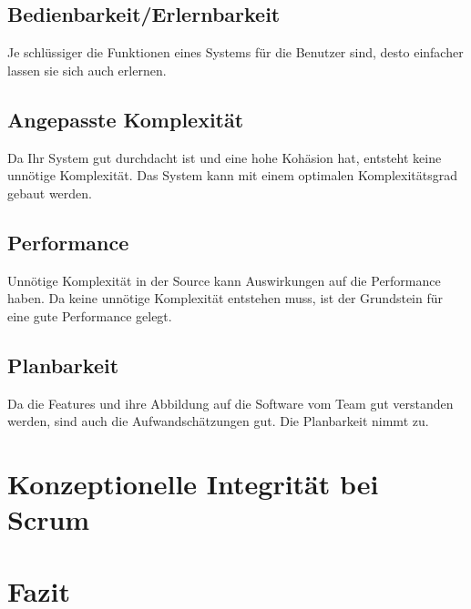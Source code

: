 \documentclass[a4paper, ngerman, 12pt, usenames, dvipsnames]{article}
\begin{document}
\subsection{Bedienbarkeit/Erlernbarkeit}
Je schlüssiger die Funktionen eines Systems für die Benutzer sind, desto einfacher lassen sie sich auch erlernen.
\subsection{Angepasste Komplexität}
Da Ihr System gut durchdacht ist und eine hohe Kohäsion hat, entsteht keine unnötige Komplexität. Das System kann mit einem optimalen Komplexitätsgrad gebaut werden.
\subsection{Performance}
Unnötige Komplexität in der Source kann Auswirkungen auf die Performance haben. Da keine unnötige Komplexität entstehen muss, ist der Grundstein für eine gute Performance gelegt.
\subsection{Planbarkeit}
Da die Features und ihre Abbildung auf die Software vom Team gut verstanden werden, sind auch die Aufwandschätzungen gut. Die Planbarkeit nimmt zu.
\section{Konzeptionelle Integrität bei Scrum}
\section{Fazit}



\end{document}
